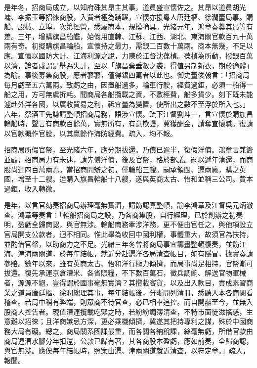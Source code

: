 \begin{pinyinscope}
是年冬，招商局成立，以知府硃其昂主其事，道員盛宣懷佐之。其昂以道員胡光墉、李振玉等招徠商股，入貲者極為踴躍，宣懷亦援粵人唐廷樞、徐潤董局事。購船、設械、立埠，次第經營，悉屬商本，規模觕具。光緒元年，鴻章奏獎其昂等有差。三年，增購旗昌船艦，始假用直隸、江蘇、江西、湖北、東海關官款百九十萬兩有奇。初擬購旗昌輪船，宣懷持之最力，需銀二百數十萬兩。商本無幾，不足以應。宣懷以國防大計、江海利源之說，力陳於江督沈葆楨。葆楨為所動，撥銀百萬以濟，論者咸謂是舉為失計，至以「旗昌棄垂敝之裘，得值另制新衣，期於適體」為喻。事後募集商股，應者寥寥，僅得銀四萬者以此也。御史董俊翰言：「招商局每月虧至五六萬兩。致虧之由，因置船過多，輪車行駛，經費過鉅，必須一船得一船之用，方可無虞折耗。聞商局各船攬載之資，不敷經費，船多貨少。刻下既未能遽赴外洋各國，以廣收貿易之利，祗宜量為變置，使所出之數不至浮於所入也。」六年，祭酒王先謙請整頓招商局務，語涉宣懷。疏下江督劉坤一，言宣懷於購旗昌輪船時，聲言有商款百餘萬，實無所有，有意欺謾，冀獲酬金，請奪宣懷職。復請以官款概作官股，以其贏餘作海防經費。疏入，均不報。

招商局所假官帑，至光緒六年，應分期拔還。乃償已逾半，復假洋債。鴻章言兼籌並顧，招商局力有未逮，請先償洋債，後及官帑，格於部議。嗣以遞年清還，而商股尚達四百萬兩焉。當招商開辦之初，僅輪船三艘。嗣承領閩、滬兩廠，購之英國，增至十二艘。迨購入旗昌輪船十八艘，遂與英商太古、怡和並稱三公司。貲本過鉅，收入轉微。

是年，以言官劾奏招商局辦理毫無實濟，請飭認真整頓，諭李鴻章及江督吳元炳澈查。鴻章等奏言：「輪船招商局之設，乃各商集股，自行經理，已於創辦之初奏明，盈虧全歸商認，與官無涉。輪船商務牽涉洋務，更不便由官任之，與他項設立官局開支公款者，迥不相同。惟此舉為收回中國利權，事體重大，故須官為扶持，並酌借官帑，以助商力之不足。光緒三年冬曾將商局事宜籌畫整頓復奏，並飭江海、津海兩關道，於每年結帳，就近分赴滬洋各局清查帳目，如有隱冒，據實奏請參賠。數年以來，雖有英商太古、怡和洋行極力傾擠，而局事尚足相持，官帑漸可拔還。復先承運京倉漕米、各省賑糧，不下數百萬石，徵兵調餉、解送官物軍械者，源源不絕，豈得謂於國事毫無實濟？其攬載客貨，以及出入款目，責成素習商業之道員唐廷樞、徐潤總理其事，每年結帳後，分晰開列清冊，悉聽入本各商閱看稽查。若局中稍有弊端，則眾商不待官查，必已相率追控。而自開辦至今，並無入股商人控告者。現值漕運攬載吃緊之時，若紛紛調簿清查，不特市面徒滋搖惑，生意難以招徠；且洋商嫉忌方深，更必乘機傾擠，冀遂其把持專利之謀，殊於中國商務大局有礙。總之，商局關系國課最重，而各關各納稅課，絲毫無虧，所借官款由商局運漕水腳分年扣還，公款已歸有著，其各商股本盈虧，應如前奏，全歸商認，與官無涉。應俟每年結帳時，照案由滬、津兩關道就近清查，以符定章。」疏入，報聞。


\end{pinyinscope}
